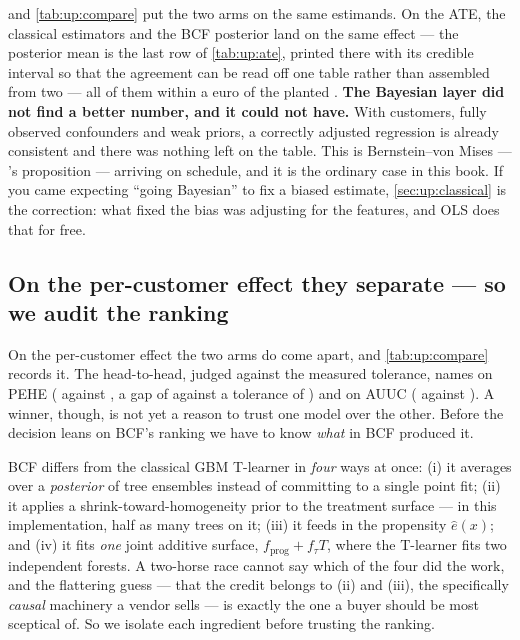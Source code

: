  and \cref{tab:up:compare} put the two arms on the same estimands. On the ATE,
the classical estimators and the BCF posterior land on the same effect --- the posterior mean is the
last row of \cref{tab:up:ate}, printed there with its credible interval so that the agreement can be
read off one table rather than assembled from two --- all of them within a euro
of the planted \eur{\nbOneTrueAte}. \textbf{The Bayesian layer did not find a better number, and
it could not have.} With \nbOneNCustomers{} customers, fully observed confounders and weak priors,
a correctly adjusted regression is already consistent and there was nothing left on the table.
This is Bernstein--von Mises --- 's proposition --- arriving on schedule, and it is the
ordinary case in this book. If you came expecting ``going Bayesian'' to fix a biased estimate,
\cref{sec:up:classical} is the correction: what fixed the bias was adjusting for the
\nbOneNFeatures{} features, and OLS does that for free.

\subsection*{On the per-customer effect they separate --- so we audit the ranking}

On the per-customer effect the two arms do come apart, and \cref{tab:up:compare} records it. The
head-to-head, judged against the measured tolerance, names \textbf{\nbOneHhPeheWin} on PEHE
(\nbOneHhPeheA{} against \nbOneHhPeheB, a gap of \nbOneHhPeheGap{} against a tolerance of
\nbOneHhPeheTol) and \textbf{\nbOneHhAuucWin} on AUUC (\nbOneHhAuucA{} against \nbOneHhAuucB). A
winner, though, is not yet a reason to trust one model over the other. Before the decision leans on
BCF's ranking we have to know \emph{what} in BCF produced it.

BCF differs from the classical GBM T-learner in \emph{four} ways at once: (i) it averages over a
\emph{posterior} of tree ensembles instead of committing to a single point fit; (ii) it applies a
shrink-toward-homogeneity prior to the treatment surface --- in this implementation, half as many
trees on it; (iii) it feeds in the propensity $\hat e(x)$; and (iv) it fits \emph{one} joint
additive surface, $f_{\text{prog}} + f_\tau T$, where the T-learner fits two independent forests. A
two-horse race cannot say which of the four did the work, and the flattering guess --- that the
credit belongs to (ii) and (iii), the specifically \emph{causal} machinery a vendor sells --- is
exactly the one a buyer should be most sceptical of. So we isolate each ingredient before trusting
the ranking.

